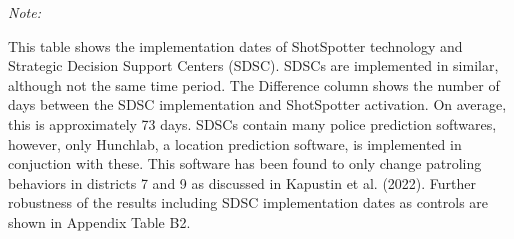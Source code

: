 \begin{table}[H]
\begin{threeparttable}
\begin{tablenotes}
\item \textit{Note: } 
\item This table shows                      the implementation dates of ShotSpotter technology and                      Strategic Decision Support Centers (SDSC). SDSCs are implemented                      in similar, although not the same time period.                      The Difference column shows the number of days between                      the SDSC implementation and ShotSpotter activation. On                      average, this is approximately                      73 days. SDSCs contain many police prediction softwares, however,                      only Hunchlab, a location prediction software,                      is implemented in conjuction with these. This software has been                      found to only change patroling behaviors in                      districts 7 and 9 as discussed in Kapustin et al. (2022). Further                      robustness of the results including SDSC implementation dates                      as controls are shown in Appendix Table B2.
\end{tablenotes}
\end{threeparttable}
\end{table}
